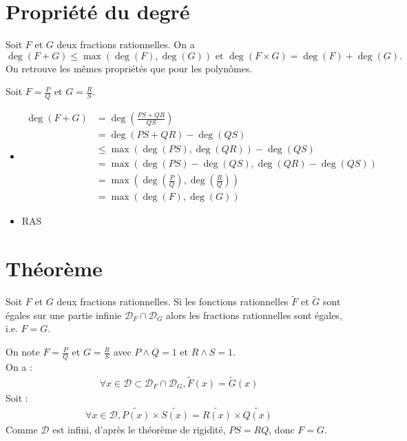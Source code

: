 \documentclass[../main.tex]{subfiles}
\begin{document}
\section{Propriété du degré}
\begin{tcolorbox}[title=Théorème 17.13, title filled=false, colframe=orange, colback=orange!10!white]
    Soit $F$ et $G$ deux fractions rationnelles. On a
    $$\deg(F + G) \leq \max(\deg(F), \deg(G)) \text{ et } \deg(F \times G) = \deg(F) + \deg(G).$$
    On retrouve les mêmes propriétés que pour les polynômes. 
\end{tcolorbox}

\noindent Soit $F = \frac{P}{Q}$ et $G = \frac{R}{S}$. 
\begin{itemize}
    \item \begin{align*}
        \deg(F + G) &= \deg(\frac{PS + QR}{QS}) \\
        &= \deg(PS + QR) - \deg(QS) \\
        &\leq \max(\deg(PS), \deg(QR)) - \deg(QS) \\
        &= \max(\deg(PS) - \deg(QS), \deg(QR) - \deg(QS)) \\
        &= \max\left(\deg \left(\frac{P}{Q}\right), \deg \left(\frac{R}{Q}\right)\right) \\
        &= \max(\deg(F), \deg(G))
    \end{align*}

    \item RAS
\end{itemize}

\section{Théorème}
\begin{tcolorbox}[title=Théorème 17.19, title filled=false, colframe=orange, colback=orange!10!white]
    Soit $F$ et $G$ deux fractions rationnelles. Si les fonctions rationnelles $\tilde F$ et $\tilde G$ sont égales sur une partie infinie $\mathcal D_F \cap \mathcal D_G$ alors les fractions rationnelles sont égales, i.e. $F = G$. 
\end{tcolorbox}

\noindent On note $F = \frac{P}{Q}$ et $G = \frac{R}{S}$ avec $P \wedge Q = 1$ et $R \wedge S = 1$. \\
On a : 
\begin{align*}
    \forall x \in \mathcal{D} \subset \mathcal{D}_F \cap \mathcal{D}_G, \tilde F(x) = \tilde G(x)
\end{align*}
Soit : 
\begin{align*}
    \forall x \in \mathcal{D}, \tilde{P(x)} \times \tilde{S(x)} = \tilde{R(x)} \times \tilde{Q(x)}
\end{align*}
Comme $\mathcal{D}$ est infini, d'après le théorème de rigidité, $PS = RQ$, donc $F = G$.
\end{document}
